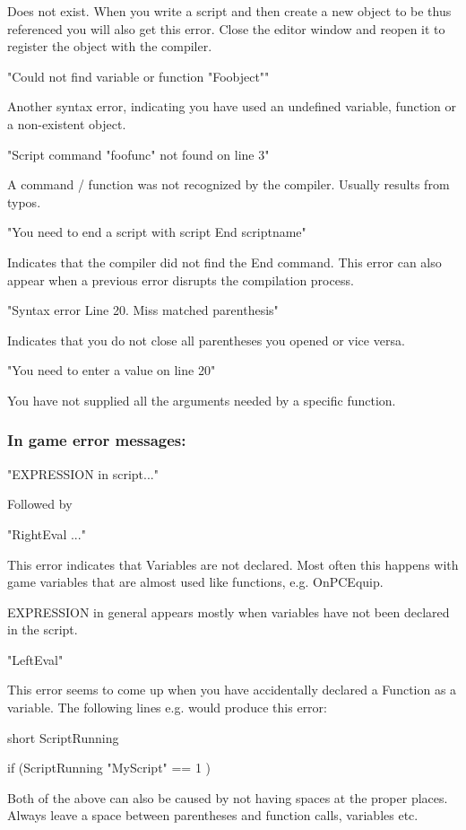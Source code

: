 Does not exist. When you write a script and then create a new object to
be thus referenced you will also get this error. Close the editor window
and reopen it to register the object with the compiler.

"Could not find variable or function "Foobject""

Another syntax error, indicating you have used an undefined variable,
function or a non-existent object.

"Script command "foofunc" not found on line 3"

A command / function was not recognized by the compiler. Usually results
from typos.

"You need to end a script with script End scriptname"

Indicates that the compiler did not find the End command. This error can
also appear when a previous error disrupts the compilation process.

"Syntax error Line 20. Miss matched parenthesis"

Indicates that you do not close all parentheses you opened or vice
versa.

"You need to enter a value on line 20"

You have not supplied all the arguments needed by a specific function.

\hypertarget{in-game-error-messages}{%
\subsubsection{In game error messages:}\label{in-game-error-messages}}

"EXPRESSION in script..."

Followed by

"RightEval ..."

This error indicates that Variables are not declared. Most often this
happens with game variables that are almost used like functions, e.g.
OnPCEquip.

EXPRESSION in general appears mostly when variables have not been
declared in the script.

"LeftEval"

This error seems to come up when you have accidentally declared a
Function as a variable. The following lines e.g. would produce this
error:

short ScriptRunning

if (ScriptRunning "MyScript" == 1 )

Both of the above can also be caused by not having spaces at the proper
places. Always leave a space between parentheses and function calls,
variables etc.

